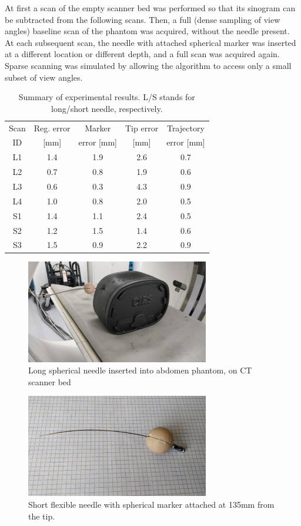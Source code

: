 \documentclass[letterpaper, 11 pt, conference]{ieeeconf}  %
\begin{document}
At first a scan of the empty scanner bed was performed so that its sinogram can be subtracted from the following scans. Then, a full (dense sampling of view angles) baseline scan of the phantom was acquired, without the needle present. At each subsequent scan, the needle with attached spherical marker was inserted at a different location or different depth, and a full scan was acquired again. Sparse scanning was simulated by allowing the algorithm to access only a small subset of view angles.

\begin{table}[t]
\label{results_table}
\begin{center}
\begin{tabular}{|c||c|c|c|c|}
\hline
Scan & Reg. error & Marker & Tip error & Trajectory\\
ID  & [mm] & error [mm] & [mm] & error  [mm]\\
\hline
\hline
L1 & 1.4 & 1.9 & 2.6 & 0.7\\
\hline
L2 & 0.7 & 0.8 & 1.9 & 0.6\\
\hline
L3 & 0.6 & 0.3 & 4.3 & 0.9 \\
\hline
L4 & 1.0 & 0.8 & 2.0 & 0.5\\
\hline
S1 & 1.4 & 1.1 & 2.4 & 0.5\\
\hline
S2 & 1.2 & 1.5 & 1.4 & 0.6\\
\hline
S3 & 1.5 & 0.9 & 2.2 & 0.9\\
\hline
\end{tabular}
\caption{Summary of experimental results. L/S stands for long/short needle, respectively.}
\end{center}
\end{table}

\begin{figure}[b]
\centering
\includegraphics[width=8cm]{long_needle_phantom.jpg}
\caption{Long spherical needle inserted into abdomen phantom, on CT scanner bed}
\label{long_needle_fig}
\end{figure}

\begin{figure}[t]
\centering
\includegraphics[width=8cm]{short_needle.jpg}
\caption{Short flexible needle with spherical marker attached at 135mm from the tip.}
\label{short_needle_fig}
\end{figure}
\end{document}
